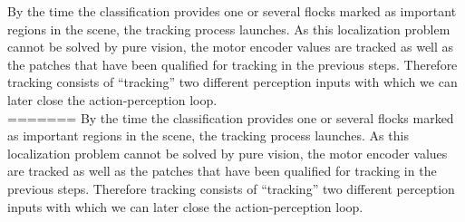 By the time the classification provides one or several flocks marked as important regions in the scene, the tracking process launches.%
As this localization problem cannot be solved by pure vision, the motor encoder values are tracked as well as the patches that have been qualified for tracking in the previous steps. Therefore tracking consists of ``tracking'' two different perception inputs with which we can later close the action-perception loop.\\ \newline
=======
By the time the classification provides one or several flocks marked as important regions in the scene, the tracking process launches.%
As this localization problem cannot be solved by pure vision, the motor encoder values are tracked as well as the patches that have been qualified for tracking in the previous steps. Therefore tracking consists of ``tracking'' two different perception inputs with which we can later close the action-perception loop.
%

